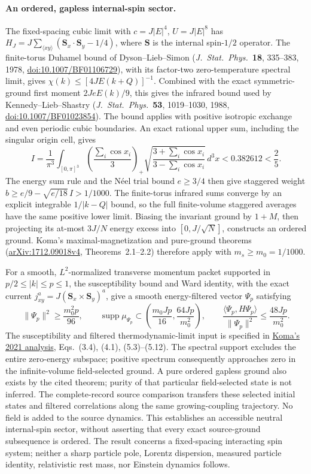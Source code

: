 \paragraph{An ordered, gapless internal-spin sector.}
The fixed-spacing cubic limit with
$c=J|E|^4$, $U=J|E|^8$ has
$H_J=J\sum_{\langle xy\rangle}(\mathbf S_x\cdot\mathbf S_y-1/4)$,
where $\mathbf S$ is the internal spin-$1/2$ operator.
The finite-torus Duhamel bound of Dyson--Lieb--Simon
(\emph{J.\ Stat.\ Phys.}\ \textbf{18}, 335--383, 1978,
\href{https://doi.org/10.1007/BF01106729}{doi:10.1007/BF01106729}),
with its factor-two zero-temperature spectral limit, gives
$\chi(k)\le[4JE(k+Q)]^{-1}$. Combined with the exact symmetric-ground
first moment $2JeE(k)/9$, this gives the infrared bound used by
Kennedy--Lieb--Shastry
(\emph{J.\ Stat.\ Phys.}\ \textbf{53}, 1019--1030, 1988,
\href{https://doi.org/10.1007/BF01023854}{doi:10.1007/BF01023854}). The bound applies
with positive isotropic exchange and even periodic cubic boundaries.
An exact rational upper sum, including the singular origin cell, gives
\[
 I=\frac1{\pi^3}\int_{[0,\pi]^3}
 \left(\frac{\sum_i\cos x_i}{3}\right)_+
 \sqrt{\frac{3+\sum_i\cos x_i}{3-\sum_i\cos x_i}}\,d^3x
 <0.382612<\frac25.
\]
The energy sum rule and the N\'eel trial bound $e\ge3/4$ then give
staggered weight $b\ge e/9-\sqrt{e/18}\,I>1/1000$.
The finite-torus infrared sums converge by an explicit integrable
$1/|k-Q|$ bound, so the full finite-volume staggered averages have the
same positive lower limit. Biasing the invariant ground by $1+M$,
then projecting its at-most $3J/N$ energy excess into
$[0,J/\sqrt N]$, constructs an ordered ground.
Koma's maximal-magnetization and pure-ground theorems
(\href{https://arxiv.org/abs/1712.09018v4}{arXiv:1712.09018v4},
Theorems~2.1--2.2) therefore apply with $m_s\ge m_0=1/1000$.

For a smooth, $L^2$-normalized transverse momentum packet supported in
$p/2\le |k|\le p\le1$, the susceptibility bound and Ward identity,
with the exact current $j_{xy}^a=J(\mathbf S_x\mathbin\times\mathbf S_y)^a$,
give a smooth energy-filtered vector $\Psi_p$ satisfying
\[
 \|\Psi_p\|^2\ge\frac{m_0^2p}{96},\qquad
 \operatorname{supp}\mu_{\Psi_p}
 \subset\left(\frac{m_0Jp}{16},\frac{64Jp}{m_0^2}\right),\qquad
 \frac{\langle\Psi_p,H\Psi_p\rangle}{\|\Psi_p\|^2}
 \le\frac{48Jp}{m_0^2}.
\]
The susceptibility and filtered thermodynamic-limit input is specified
in \href{https://arxiv.org/abs/2105.04970v2}{Koma's 2021 analysis},
Eqs.~(3.4), (4.1), (5.3)--(5.12).
The spectral support excludes the entire zero-energy subspace;
positive spectrum consequently approaches zero in the infinite-volume
field-selected ground. A pure ordered gapless ground also exists by
the cited theorem; purity of that particular field-selected state is
not inferred.
The complete-record source comparison transfers these selected initial
states and filtered correlations along the same growing-coupling
trajectory. No field is added to the source dynamics. This establishes
an accessible neutral internal-spin sector, without asserting that every
exact source-ground subsequence is ordered.
The result concerns a fixed-spacing interacting spin system; neither
a sharp particle pole, Lorentz dispersion, measured particle identity,
relativistic rest mass, nor Einstein dynamics follows.
